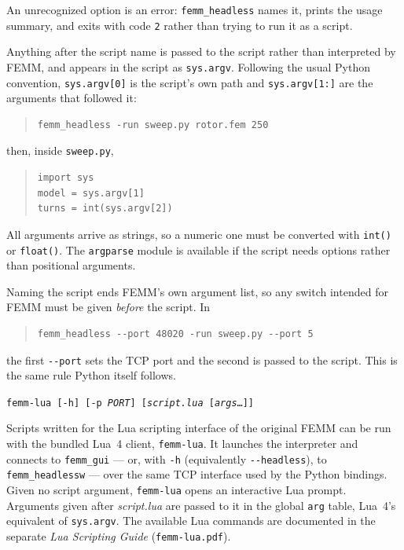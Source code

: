 \documentclass[12pt]{report}
\begin{document}
\noindent An unrecognized option is an error: {\tt femm\_headless} names it,
prints the usage summary, and exits with code {\tt 2} rather than trying to run
it as a script.

\vspace{1ex}
  Anything after the script name
is passed to the script rather than interpreted by FEMM, and appears in the
script as {\tt sys.argv}.  Following the usual Python convention,
{\tt sys.argv[0]} is the script's own path and {\tt sys.argv[1:]} are the
arguments that followed it:

\begin{quote}
\begin{verbatim}
femm_headless -run sweep.py rotor.fem 250
\end{verbatim}
\end{quote}

\noindent then, inside {\tt sweep.py},

\begin{quote}
\begin{verbatim}
import sys
model = sys.argv[1]
turns = int(sys.argv[2])
\end{verbatim}
\end{quote}

\noindent All arguments arrive as strings, so a numeric one must be converted
with {\tt int()} or {\tt float()}.  The {\tt argparse} module is available if
the script needs options rather than positional arguments.

Naming the script ends FEMM's own argument list, so any switch intended for
FEMM must be given \emph{before} the script.  In

\begin{quote}
\begin{verbatim}
femm_headless --port 48020 -run sweep.py --port 5
\end{verbatim}
\end{quote}

\noindent the first {\tt -{}-port} sets the TCP port and the second is passed
to the script.  This is the same rule Python itself follows.

\vspace{1ex}
 \texttt{femm-lua [-h] [-p {\itshape PORT}] [{\itshape script.lua} [{\itshape args}\ldots]]}

Scripts written for the Lua scripting interface of the original FEMM can be run
with the bundled Lua~4 client, {\tt femm-lua}.  It launches the interpreter and
connects to {\tt femm\_gui} --- or, with {\tt -h} (equivalently
{\tt -{}-headless}), to {\tt femm\_headlessw} --- over the same TCP interface used
by the Python bindings.  Given no script argument, {\tt femm-lua} opens an
interactive Lua prompt.  Arguments given after {\itshape script.lua} are
passed to it in the global {\tt arg} table, Lua~4's equivalent of
{\tt sys.argv}.  The available Lua commands are documented in the separate
{\itshape Lua Scripting Guide} ({\tt femm-lua.pdf}).
\end{document}
